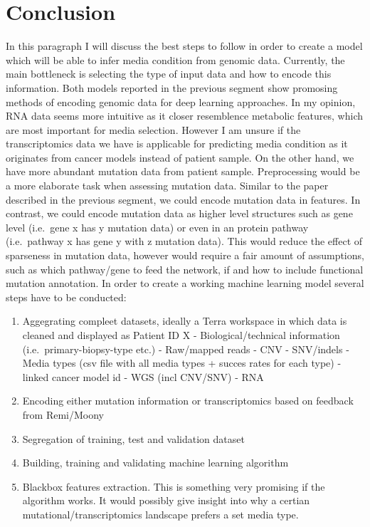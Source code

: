 \documentclass[11pt,]{article}
\providecommand{\tightlist}{%
\setlength{\itemsep}{0pt}\setlength{\parskip}{0pt}}
\begin{document}
\hypertarget{conclusion}{%
\section{Conclusion}\label{conclusion}}

In this paragraph I will discuss the best steps to follow in order to
create a model which will be able to infer media condition from genomic
data. Currently, the main bottleneck is selecting the type of input data
and how to encode this information. Both models reported in the previous
segment show promosing methods of encoding genomic data for deep
learning approaches. In my opinion, RNA data seems more intuitive as it
closer resemblence metabolic features, which are most important for
media selection. However I am unsure if the transcriptomics data we have
is applicable for predicting media condition as it originates from
cancer models instead of patient sample. On the other hand, we have more
abundant mutation data from patient sample. Preprocessing would be a
more elaborate task when assessing mutation data. Similar to the paper
described in the previous segment, we could encode mutation data in
features. In contrast, we could encode mutation data as higher level
structures such as gene level (i.e.~gene x has y mutation data) or even
in an protein pathway (i.e.~pathway x has gene y with z mutation data).
This would reduce the effect of sparseness in mutation data, however
would require a fair amount of assumptions, such as which pathway/gene
to feed the network, if and how to include functional mutation
annotation. In order to create a working machine learning model several
steps have to be conducted:

\begin{enumerate}
\def\labelenumi{\arabic{enumi}.}
\tightlist
\item
  Aggegrating compleet datasets, ideally a Terra workspace in which data
  is cleaned and displayed as Patient ID X - Biological/technical
  information (i.e.~primary-biopsy-type etc.) - Raw/mapped reads - CNV -
  SNV/indels - Media types (csv file with all media types + succes rates
  for each type) - linked cancer model id - WGS (incl CNV/SNV) - RNA
\item
  Encoding either mutation information or transcriptomics based on
  feedback from Remi/Moony
\item
  Segregation of training, test and validation dataset
\item
  Building, training and validating machine learning algorithm
\item
  Blackbox features extraction. This is something very promising if the
  algorithm works. It would possibly give insight into why a certian
  mutational/transcriptomics landscape prefers a set media type.
\end{enumerate}
\end{document}
